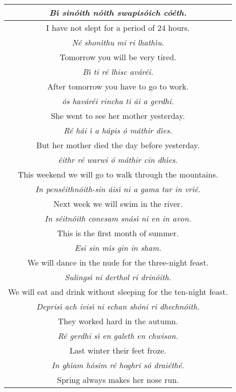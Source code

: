 \begin{table}[H]
{\begin{tabular}{|c|}
  \textit{B\'{\i} sin\'{o}ith n\'{o}ith swapis\'{o}ich c\'{o}\'{e}th.}\\
  \midrule
  I have not slept for a period of 24 hours.\\
  \textit{N\'{e} shon\'{\i}thu mi ri lhath\'{\i}u.}\\
  \midrule
  Tomorrow you will be very tired.\\
  \textit{B\'{\i} ti r\'{e} lhisc av\'{a}r\'{e}i.}\\
  \midrule
  After tomorrow you have to go to work.\\
  \textit{\'{o}s hav\'{a}r\'{e}i rincha ti \'{a}i a gerdhi.}\\
  \midrule
  She went to see her mother yesterday.\\
  \textit{R\'{e} h\'{a}i \'{\i} a h\'{a}pis \'{o} m\'{a}thir d\'{\i}es.}\\
  \midrule
  But her mother died the day before yesterday.\\
  \textit{\'{e}ithr r\'{e} warwi \'{o} m\'{a}thir cin dh\'{\i}es.}\\
  \midrule
  This weekend we will go to walk through the mountains.\\
  \textit{In pens\'{e}ithn\'{o}ith-sin \'{a}is\'{\i} ni a gama tar in vr\'{\i}\'{e}.}\\
  \midrule
  Next week we will swim in the river.\\
  \textit{In s\'{e}itn\'{o}ith conesam sn\'{a}s\'{\i} ni en in avon.}\\
  \midrule
  This is the first month of summer.\\
  \textit{Esi sin m\'{\i}s gin in sham.}\\
  \midrule
  We will dance in the nude for the three-night feast.\\
  \textit{Sulings\'{\i} ni derthol ri drin\'{o}ith.}\\
  \midrule
  We will eat and drink without sleeping for the ten-night feast.\\
  \textit{Depris\'{\i} ach ivis\'{\i} ni echan sh\'{o}ni ri dhechn\'{o}ith.}\\
  \midrule
  They worked hard in the autumn.\\
  \textit{R\'{e} gerdhi s\'{\i} en galeth en chwison.}\\
  \midrule
  Last winter their feet froze.\\
  \textit{In gh\'{\i}am h\'{o}sim r\'{e} hoghri s\'{o} drai\'{e}th\'{e}.}\\
  \midrule
  Spring always makes her nose run.\\

\end{tabular}}
\end{table}

